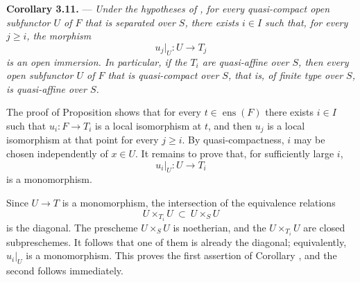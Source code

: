 \medskip
\noindent{}\textbf{Corollary 3.11.} ---
\textit{Under the hypotheses of
, for every quasi-compact open
subfunctor \(U\) of \(F\) that is separated over \(S\), there exists
\(i\in I\) such that, for every \(j\geq i\), the morphism
\[
  u_j|_U:U\longrightarrow T_j
\]
is an open immersion.  In particular, if the \(T_i\) are quasi-affine
over \(S\), then every open subfunctor \(U\) of \(F\) that is
quasi-compact over \(S\), that is, of finite type over \(S\), is
quasi-affine over \(S\).}

The proof of Proposition
 shows that for every
\(t\in\operatorname{ens}(F)\) there exists \(i\in I\) such that
\(u_i:F\to T_i\) is a local isomorphism at \(t\), and then \(u_j\)
is a local isomorphism at that point for every \(j\geq i\).  By
quasi-compactness, \(i\) may be chosen independently of \(x\in U\).
It remains to prove that, for sufficiently large \(i\),
\[
  u_i|_U:U\longrightarrow T_i
\]
is a monomorphism.

Since \(U\to T\) is a monomorphism, the intersection of the
equivalence relations
\[
  U\times_{T_i}U\ \subset\ U\times_S U
\]
is the diagonal.  The prescheme \(U\times_S U\) is noetherian, and
the \(U\times_{T_i}U\) are closed subpreschemes.  It follows that one
of them is already the diagonal; equivalently, \(u_i|_U\) is a
monomorphism.  This proves the first assertion of Corollary
, and the second follows
immediately.

